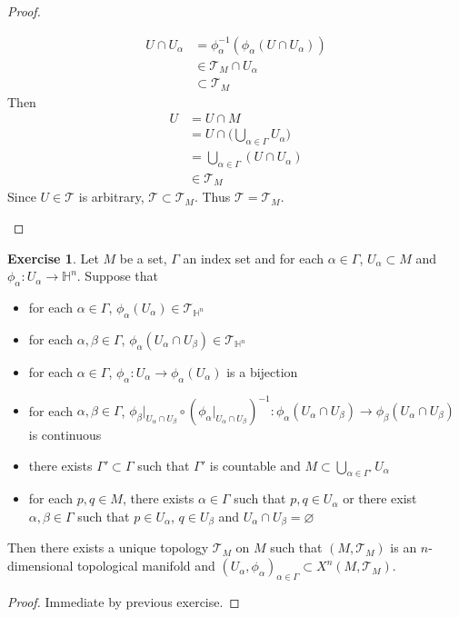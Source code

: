 \documentclass{book}
\theoremstyle{definition}
\newtheorem{ex}[definition]{Exercise}
\newcommand{\al}{\alpha}
\newcommand{\be}{\beta}
\newcommand{\Gam}{\Gamma}
\renewcommand{\H}{\mathbb{H}}
\newcommand{\MT}{\mathcal{T}}
\DeclareMathOperator*{\0}{\mbf{0}}
\DeclareMathOperator*{\1}{\mbf{1}}
\begin{document}
\begin{proof}
\begin{enumerate}
	\begin{align*}
		U \cap U_{\al}
		& = \phi_{\al}^{-1}( \phi_{\al}(U \cap U_{\al})) \\
		& \in \MT_M \cap U_{\al} \\
		& \subset \MT_M 
	\end{align*}
	Then 
	\begin{align*}
		U
		& = U \cap M \\
		& = U \cap \bigg(\bigcup_{\al \in \Gam} U_{\al} \bigg) \\
		& = \bigcup_{\al \in \Gam} (U \cap U_{\al}) \\
		& \in \MT_M 
	\end{align*}
	Since $U \in \MT$ is arbitrary, $\MT \subset \MT_M$. Thus $\MT = \MT_M$.
	\end{enumerate}
\end{proof}

\begin{ex}
	Let $M$ be a set, $\Gam$ an index set and for each $\al \in \Gam$, $U_{\al} \subset M$ and $\phi_{\al}: U_{\al} \rightarrow \H^n$. Suppose that 
	\begin{itemize}
		\item for each $\al \in \Gam$, $\phi_{\al}(U_{\al}) \in \MT_{\H^n}$ 
		\item for each $\al, \be \in \Gam$, $\phi_{\al}(U_{\al} \cap U_{\be}) \in \MT_{\H^n}$
		\item for each $\al \in \Gam$, $\phi_{\al}: U_{\al} \rightarrow \phi_{\al}(U_{\al})$ is a bijection
		\item for each $\al, \be \in \Gam$, $\phi_{\be}|_{U_{\al} \cap U_{\be}} \circ (\phi_{\al}|_{U_{\al} \cap U_{\be}})^{-1}: \phi_{\al}(U_{\al} \cap U_{\be}) \rightarrow \phi_{\be}(U_{\al} \cap U_{\be})$ is continuous
		\item there exists $\Gam' \subset \Gam$ such that $\Gam'$ is countable and $M \subset \bigcup\limits_{\al \in \Gam'} U_{\al}$
		\item for each $p,q \in M$, there exists $\al \in \Gam$ such that $p,q \in U_{\al}$ or there exist $\al,\be \in \Gam$ such that $p \in U_{\al}$, $q \in U_{\be}$ and $U_{\al} \cap U_{\be} = \varnothing$
	\end{itemize}
	Then there exists a unique topology $\MT_M$ on $M$ such that $(M, \MT_M)$ is an $n$-dimensional topological manifold and $(U_{\al}, \phi_{\al})_{\al \in \Gam} \subset X^n(M, \MT_M)$.
\end{ex}

	\begin{proof}
		Immediate by previous exercise. 
	\end{proof}
\end{document}
